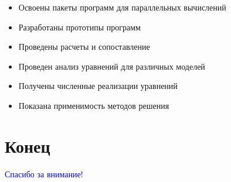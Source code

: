 \begin{frame}
\frametitle{\insertsection}
\framesubtitle{\insertsubsection}

\begin{itemize}
    \item Освоены пакеты программ для параллельных вычислений
    \item Разработаны прототипы программ
    \item Проведены расчеты и сопоставление
    \item Проведен анализ уравнений для различных моделей
    \item Получены численные реализации уравнений
    \item Показана применимость методов решения
\end{itemize}
\end{frame}


\section{Конец}

\begin{frame}[plain]
\centering
\btVFill
\textcolor{Blue}{\Large Спасибо за внимание!}
\btVFill
\end{frame}
